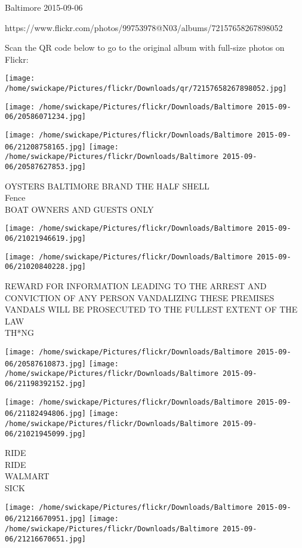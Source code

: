 \documentclass[10pt,letterpaper]{article}
\begin{document}
Baltimore 2015-09-06

https://www.flickr.com/photos/99753978@N03/albums/72157658267898052

Scan the QR code below to go to the original album with full-size photos on Flickr:

\texttt{[image: /home/swickape/Pictures/flickr/Downloads/qr/72157658267898052.jpg]}
\pagebreak

\texttt{[image: /home/swickape/Pictures/flickr/Downloads/Baltimore 2015-09-06/20586071234.jpg]}

\vspace{0.25in}
\texttt{[image: /home/swickape/Pictures/flickr/Downloads/Baltimore 2015-09-06/21208758165.jpg]}
\texttt{[image: /home/swickape/Pictures/flickr/Downloads/Baltimore 2015-09-06/20587627853.jpg]}

OYSTERS BALTIMORE BRAND THE HALF SHELL\\
Fence\\
BOAT OWNERS AND GUESTS ONLY
\pagebreak

\texttt{[image: /home/swickape/Pictures/flickr/Downloads/Baltimore 2015-09-06/21021946619.jpg]}

\vspace{0.25in}
\texttt{[image: /home/swickape/Pictures/flickr/Downloads/Baltimore 2015-09-06/21020840228.jpg]}

REWARD FOR INFORMATION LEADING TO THE ARREST AND CONVICTION OF ANY PERSON VANDALIZING THESE PREMISES VANDALS WILL BE PROSECUTED TO THE FULLEST EXTENT OF THE LAW\\
TH*NG
\pagebreak

\texttt{[image: /home/swickape/Pictures/flickr/Downloads/Baltimore 2015-09-06/20587610873.jpg]}
\texttt{[image: /home/swickape/Pictures/flickr/Downloads/Baltimore 2015-09-06/21198392152.jpg]}

\texttt{[image: /home/swickape/Pictures/flickr/Downloads/Baltimore 2015-09-06/21182494806.jpg]}
\texttt{[image: /home/swickape/Pictures/flickr/Downloads/Baltimore 2015-09-06/21021945099.jpg]}

RIDE\\
RIDE\\
WALMART\\
SICK
\pagebreak

\texttt{[image: /home/swickape/Pictures/flickr/Downloads/Baltimore 2015-09-06/21216670951.jpg]}
\texttt{[image: /home/swickape/Pictures/flickr/Downloads/Baltimore 2015-09-06/21216670651.jpg]}
\end{document}

